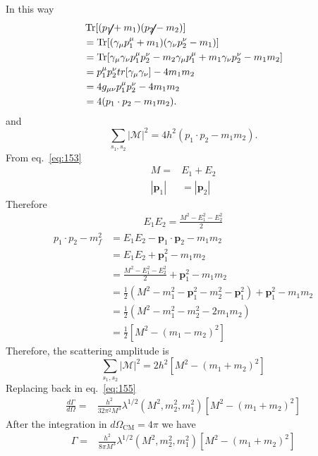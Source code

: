In this way
\begin{align*}
&\operatorname{Tr}[(\cancel{p}_{1}+m_{1})(\cancel{p}_{2}-m_{2})]\\
&=\operatorname{Tr}[(\gamma_{\mu}p^{\mu}_{1}+m_{1})(\gamma_{\nu}p^{\nu}_{2}-m_{1})]\\
&=\operatorname{Tr}[\gamma_{\mu}\gamma_{\nu}p^{\mu}_{1}p^{\nu}_{2}-m_{2}\gamma_{\mu}p^{\mu}_{1}+m_{1}\gamma_{\nu}p^{\nu}_{2}-m_{1}m_2]\\
&=p^{\mu}_{1}p^{\nu}_{2}tr[\gamma_{\mu}\gamma_{\nu}]-4m_1 m_2\\
&=4g_{\mu\nu}p^{\mu}_{1}p^{\nu}_{2}-4m_1m_2\\
&=4(p_{1}\cdot p_{2}-m_1m_2). 
\end{align*}
and
\begin{equation*}
\sum_{s_1,s_2}|\mathcal{M}|^{2}=4h^2(p_{1}\cdot p_{2}-m_{1}m_2).
\end{equation*}
From eq.~\eqref{eq:153}
\begin{align}
  M=&E_1+E_2\nonumber\\
|\mathbf{p}_1|&=|\mathbf{p}_2|
\end{align}
Therefore
\begin{align}
  E_1E_2=\frac{M^2-E_1^2-E_2^2}{2}
\end{align}
\begin{align*}
p_{1}\cdot p_{2}-m^{2}_{f}&=E_{1}E_{2}-\mathbf{p}_{1}\cdot\mathbf{p}_{2}-m_1 m_2\\
&=E_{1}E_{2}+\mathbf{p}_{1}^2-m_1 m_2\\
&=\frac{M^2-E_1^2-E_2^2}{2}+\mathbf{p}_{1}^2-m_1 m_2\nonumber\\
&=\frac12\left(M^2-m_1^2-\mathbf{p}_1^2-m_2^2-\mathbf{p}_1^2\right)+\mathbf{p}_{1}^2-m_1 m_2\\
&=\frac12\left(M^2-m_1^2-m_2^2-2m_1m_2\right)\\
&=\frac12\left[M^2-(m_1-m_2)^2\right]
\end{align*}
Therefore, the scattering  amplitude is
\begin{equation}
\sum_{s_1,s_2}|\mathcal{M}|^{2}=2h^2\left[M^2-(m_1+m_2)^2\right]
\label{eq:82}
\end{equation}
Replacing back in eq.~\eqref{eq:155}
\begin{align}
\frac{d\Gamma}{d\Omega}=
&\frac{h^2}{32 \pi^2M^3}\lambda^{1/2}(M^2,m_2^2,m_1^2)\left[M^2-(m_1+m_2)^2\right]
\end{align}
After the integration in $d\Omega_{\text{CM}}=4\pi$ we have
\begin{align}
\Gamma=&\frac{h^2}{8 \pi M^3}\lambda^{1/2}(M^2,m_2^2,m_1^2)\left[M^2-(m_1+m_2)^2\right]
\end{align}
